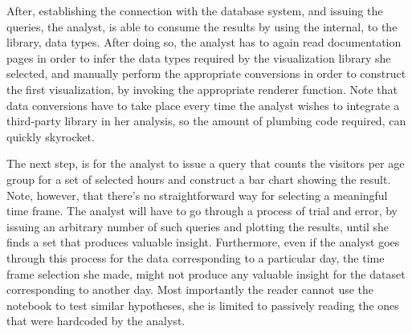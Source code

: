  
After, establishing the connection with the database system, and issuing the queries, the analyst, is able to consume the results by using the internal, to the library, data types. After doing so, the analyst has to again read documentation pages in order to infer the data types required by the visualization library she selected, and manually perform the appropriate conversions in order to construct the first visualization, by invoking the appropriate renderer function. Note that data conversions have to take place every time the analyst wishes to integrate a third-party library in her analysis, so the amount of plumbing code required, can quickly skyrocket.


The next step, is for the analyst to issue a query that counts the visitors per age group for a set of selected hours and construct a bar chart showing the result. Note, however, that there's no straightforward way for selecting a meaningful time frame. The analyst will have to go through a process of trial and error, by issuing an arbitrary number of such queries and plotting the results, until she finds a set that produces valuable insight. Furthermore, even if the analyst goes through this process for the data corresponding to a particular day, the time frame selection she made, might not produce any valuable insight for the dataset corresponding to another day. Most importantly the reader cannot use the notebook to test similar hypotheses, she is limited to passively reading the ones that were hardcoded by the analyst. 

\vspace*{-0.4cm}

